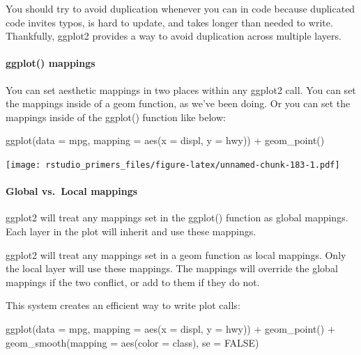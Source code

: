 \documentclass[
]{article}
\newenvironment{Shaded}{\begin{snugshade}}{\end{snugshade}}
\newcommand{\AttributeTok}[1]{\textcolor[rgb]{0.77,0.63,0.00}{#1}}
\newcommand{\ConstantTok}[1]{\textcolor[rgb]{0.00,0.00,0.00}{#1}}
\newcommand{\FunctionTok}[1]{\textcolor[rgb]{0.00,0.00,0.00}{#1}}
\newcommand{\NormalTok}[1]{#1}
\newcommand{\SpecialCharTok}[1]{\textcolor[rgb]{0.00,0.00,0.00}{#1}}
\begin{document}
You should try to avoid duplication whenever you can in code because
duplicated code invites typos, is hard to update, and takes longer than
needed to write. Thankfully, ggplot2 provides a way to avoid duplication
across multiple layers.

\hypertarget{ggplot-mappings}{%
\paragraph{ggplot() mappings}\label{ggplot-mappings}}

You can set aesthetic mappings in two places within any ggplot2 call.
You can set the mappings inside of a geom function, as we've been doing.
Or you can set the mappings inside of the ggplot() function like below:

\begin{Shaded}
\begin{Highlighting}[]
\FunctionTok{ggplot}\NormalTok{(}\AttributeTok{data =}\NormalTok{ mpg, }\AttributeTok{mapping =} \FunctionTok{aes}\NormalTok{(}\AttributeTok{x =}\NormalTok{ displ, }\AttributeTok{y =}\NormalTok{ hwy)) }\SpecialCharTok{+}
  \FunctionTok{geom\_point}\NormalTok{()}
\end{Highlighting}
\end{Shaded}

\texttt{[image: rstudio\_primers\_files/figure-latex/unnamed-chunk-183-1.pdf]}

\hypertarget{global-vs.-local-mappings}{%
\paragraph{Global vs.~Local mappings}\label{global-vs.-local-mappings}}

ggplot2 will treat any mappings set in the ggplot() function as global
mappings. Each layer in the plot will inherit and use these mappings.

ggplot2 will treat any mappings set in a geom function as local
mappings. Only the local layer will use these mappings. The mappings
will override the global mappings if the two conflict, or add to them if
they do not.

This system creates an efficient way to write plot calls:

\begin{Shaded}
\begin{Highlighting}[]
\FunctionTok{ggplot}\NormalTok{(}\AttributeTok{data =}\NormalTok{ mpg, }\AttributeTok{mapping =} \FunctionTok{aes}\NormalTok{(}\AttributeTok{x =}\NormalTok{ displ, }\AttributeTok{y =}\NormalTok{ hwy)) }\SpecialCharTok{+}
  \FunctionTok{geom\_point}\NormalTok{() }\SpecialCharTok{+}
  \FunctionTok{geom\_smooth}\NormalTok{(}\AttributeTok{mapping =} \FunctionTok{aes}\NormalTok{(}\AttributeTok{color =}\NormalTok{ class), }\AttributeTok{se =} \ConstantTok{FALSE}\NormalTok{)}
\end{Highlighting}
\end{Shaded}
\end{document}
